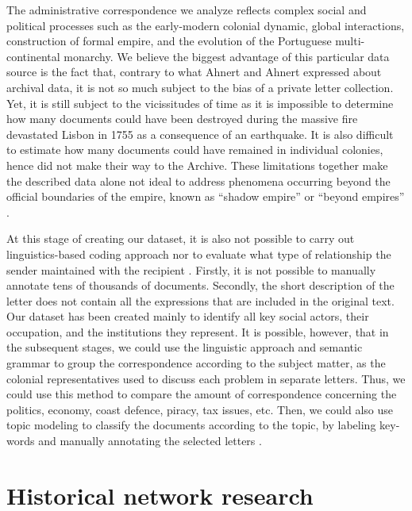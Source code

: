 \documentclass{article}
\begin{document}
The administrative correspondence we analyze reflects complex social and political processes such as the early-modern colonial dynamic, global interactions, construction of formal empire, and the evolution of the Portuguese multi-continental monarchy. We believe the biggest advantage of this particular data source is the fact that, contrary to what Ahnert and Ahnert \cite{ahnert_protestant_2015} expressed about archival data, it is not so much subject to the bias of a private letter collection. Yet, it is still subject to the vicissitudes of time as it is impossible to determine how many documents could have been destroyed during the massive fire devastated Lisbon in 1755 as a consequence of an earthquake. It is also difficult to  estimate how many documents could have remained in individual colonies, hence did not make their way to the Archive. These limitations together make the described data alone not ideal to address phenomena occurring beyond the official boundaries of the empire, known as “shadow empire” \cite{hespanha_filhos_2019} or “beyond empires” \cite{antunes_beyond_2016}. 

At this stage of creating our dataset, it is also not possible to carry out linguistics-based coding approach \cite{franzosi_narrative_1998} nor to evaluate what type of relationship the sender maintained with the recipient \cite{kenna_maths_2015}.  Firstly, it is not possible to manually annotate tens of thousands of documents. Secondly, the short description of the letter does not contain all the expressions that are included in the original text. Our dataset has been created mainly to identify all key social actors, their occupation, and the institutions they represent. It is possible, however, that in the subsequent stages, we could use the linguistic approach and semantic grammar to group the correspondence according to the subject matter, as the colonial representatives used to discuss each problem in separate letters. Thus, we could use this method to compare the amount of correspondence concerning the politics, economy, coast defence, piracy, tax issues, etc. Then, we could also use topic modeling to classify the documents according to the topic, by labeling key-words and manually annotating the selected letters \cite{wittek_supporting_2011}.

\section{Historical network research}
\end{document}
